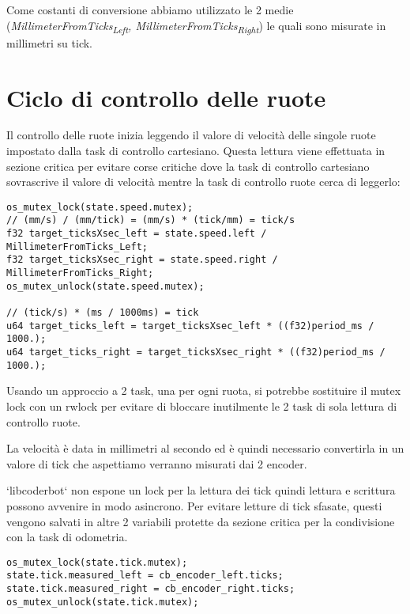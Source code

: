 \documentclass[11pt]{article}
\begin{document}
Come costanti di conversione abbiamo utilizzato le 2 medie (\emph{MillimeterFromTicks\textsubscript{Left}, MillimeterFromTicks\textsubscript{Right}}) le quali sono misurate in millimetri su tick.
\section{Ciclo di controllo delle ruote}
\label{sec:org3f027c6}
Il controllo delle ruote inizia leggendo il valore di velocità delle singole ruote impostato dalla task di controllo cartesiano. Questa lettura viene effettuata in sezione critica per evitare corse critiche dove la task di controllo cartesiano sovrascrive il valore di velocità mentre la task di controllo ruote cerca di leggerlo:
\begin{verbatim}
os_mutex_lock(state.speed.mutex);
// (mm/s) / (mm/tick) = (mm/s) * (tick/mm) = tick/s
f32 target_ticksXsec_left = state.speed.left / MillimeterFromTicks_Left;
f32 target_ticksXsec_right = state.speed.right / MillimeterFromTicks_Right;
os_mutex_unlock(state.speed.mutex);

// (tick/s) * (ms / 1000ms) = tick
u64 target_ticks_left = target_ticksXsec_left * ((f32)period_ms / 1000.);
u64 target_ticks_right = target_ticksXsec_right * ((f32)period_ms / 1000.);
\end{verbatim}
Usando un approccio a 2 task, una per ogni ruota, si potrebbe sostituire il mutex lock con un rwlock per evitare di bloccare inutilmente le 2 task di sola lettura di controllo ruote.

La velocità è data in millimetri al secondo ed è quindi necessario convertirla in un valore di tick che aspettiamo verranno misurati dai 2 encoder.

`libcoderbot` non espone un lock per la lettura dei tick quindi lettura e scrittura possono avvenire in modo asincrono. Per evitare letture di tick sfasate, questi vengono salvati in altre 2 variabili protette da sezione critica per la condivisione con la task di odometria.
\begin{verbatim}
os_mutex_lock(state.tick.mutex);
state.tick.measured_left = cb_encoder_left.ticks;
state.tick.measured_right = cb_encoder_right.ticks;
os_mutex_unlock(state.tick.mutex);
\end{verbatim}
\end{document}
